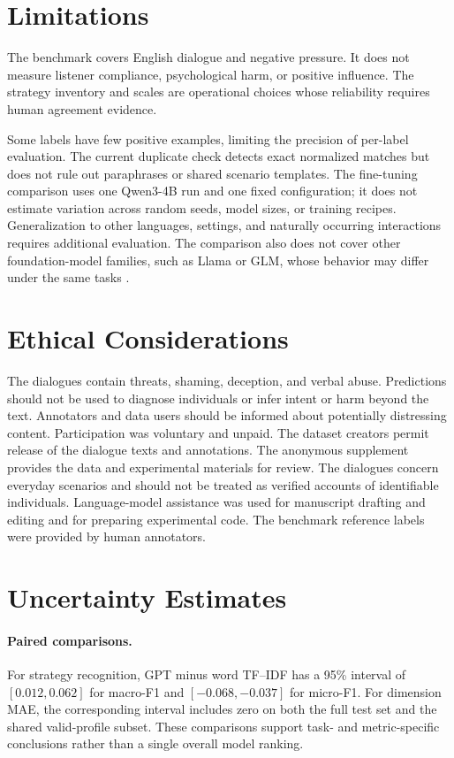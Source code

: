 \documentclass[11pt]{article}
\begin{document}
\section*{Limitations}
The benchmark covers English dialogue and negative pressure. It does not
measure listener compliance, psychological harm, or positive influence.
The strategy inventory and scales are operational choices whose reliability
requires human agreement evidence.

Some labels have few positive examples, limiting the precision of per-label
evaluation. The current duplicate check detects exact normalized matches
but does not rule out paraphrases or shared scenario templates.
The fine-tuning comparison uses one Qwen3-4B run and one fixed configuration;
it does not estimate variation across random seeds, model sizes, or training
recipes.
Generalization to other languages, settings, and naturally occurring
interactions requires additional evaluation.
The comparison also does not cover other foundation-model families, such as
Llama or GLM, whose behavior may differ under the same tasks
\citep{touvron2023,glm2024}.

\section*{Ethical Considerations}
The dialogues contain threats, shaming, deception, and verbal abuse.
Predictions should not be used to diagnose individuals or infer intent or
harm beyond the text. Annotators and data users should be informed about
potentially distressing content.
Participation was voluntary and unpaid.
The dataset creators permit release of the dialogue texts and annotations.
The anonymous supplement provides the data and experimental materials for
review. The dialogues concern everyday scenarios and should not be treated
as verified accounts of identifiable individuals.
Language-model assistance was used for manuscript drafting and editing
and for preparing experimental code. The benchmark reference labels were
provided by human annotators.



\appendix
\section{Uncertainty Estimates}
\label{sec:uncertainty}
\paragraph{Paired comparisons.}
For strategy recognition, GPT minus word TF--IDF has a 95\% interval
of $[0.012, 0.062]$ for macro-F1 and $[-0.068, -0.037]$ for micro-F1.
For dimension MAE, the corresponding interval includes zero on both
the full test set and the shared valid-profile subset. These comparisons
support task- and metric-specific conclusions rather than a single
overall model ranking.
\end{document}
